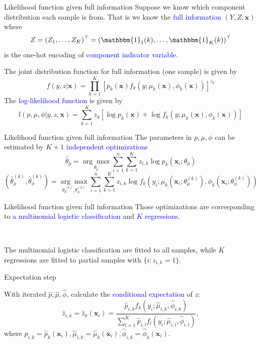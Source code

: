 \documentclass[professionalfont]{beamer}
\def\bx{\boldsymbol{x}}
\newcommand{\blue}[1]{\textcolor{blue}{#1}}
\begin{document}
\begin{frame}{Likelihood function given full information}
Suppose we know which component distribution each sample is from. That is we know the \blue{full information} $(Y,Z,\bx)$ where
$$Z=(Z_1,\ldots,Z_K)^\top=(\mathbbm{1}_1(k),\ldots,\mathbbm{1}_K(k))^\top$$
is the one-hot encoding of \blue{component indicator variable}.


The joint distribution function for full information (one sample) is given by 
	$$f(y,z|
	\bx) = \prod_{k=1}^K\left[p_k(\bx)f_k(y;\mu_k(\bx),\phi_k(\bx))\right]^{z_k}$$
The \blue{log-likelihood function} is given by 
\begin{equation}\label{full-L}
		l(p,\mu,\phi|y,z,\bx)=\sum_{k=1}^K z_k\left[\log p_k(\bx) + \log f_k(y;\mu_k(\bx),\phi_k(\bx))\right]
\end{equation}
\end{frame}

\begin{frame}{Likelihood function given full information}
	The parameters in $p,\mu,\phi$ can be estimated by $K+1$ \blue{independent optimizations} 
	\begin{equation}\label{p-reg}
		\hat{\theta}_p=\underset{\theta_p}{\arg\max}\sum_{i=1}^n\sum_{k=1}^Kz_{i,k}\log p_k(\bx_i;\theta_p)
	\end{equation}
	\begin{equation}\label{comp-reg}
		\left(\hat{\theta}_\mu^{(k)},\hat{\theta}_\phi^{(k)}\right)=\underset{\theta^{(k)}_\mu,\theta^{(k)}_\phi}{\arg\max}\sum_{i=1}^n\sum_{k=1}^Kz_{i,k}\log f_k\left(y_i;\mu_k\left(\bx_i;\theta_\mu^{(k)}\right),\phi_k\left(\bx_i;\theta_\phi^{(k)}\right)\right)
	\end{equation}
\end{frame}

\begin{frame}{Likelihood function given full information}
Those optimizations are corresponding to  \blue{a multinomial logistic classification} and \blue{$K$ regressions}.

~

The multinomial logistic classification are fitted to all samples, while $K$ regressions are fitted to {partial} samples with $\{i:z_{i,k}=1\}$. 
\end{frame}

\begin{frame}{Expectation step}
	
	
	With iterated $\hat{p},\hat{\mu},\hat{\phi}$, calculate the \blue{conditional expectation} of $z$:
		$$\hat{z}_{i,k}=\hat{z}_k(\bx_i)=\frac{\hat{p}_{i,k}f_k(y_i;\hat{\mu}_{i,k},\hat{\phi}_{i,k})}{\sum_{l=1}^K\hat{p}_{i,l}f_l(y_i;\hat{\mu}_{i,l},\hat{\phi}_{i,l})},$$
		where
		$\hat{p}_{i,k}=\hat{p}_k(\bx_i),\hat{\mu}_{i,k}=\hat{\mu}_k(\bx_i),\hat{\phi}_{i,k}=\hat{\phi}_k(\bx_i)$.
\end{frame}
\end{document}
